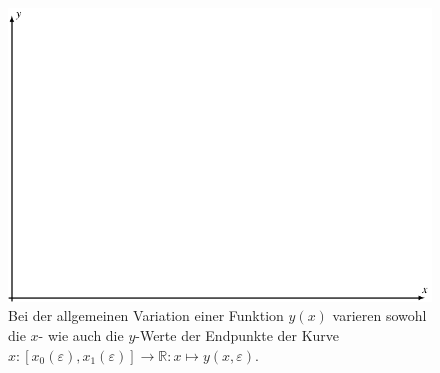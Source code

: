 %
%
%
\begin{figure}
\centering
\includegraphics{chapters/020-variation/images/variation.pdf}
\caption{Bei der allgemeinen Variation einer Funktion $y(x)$
varieren sowohl die $x$- wie auch die $y$-Werte der Endpunkte
der Kurve
$x\colon [x_0(\varepsilon),x_1(\varepsilon)]\to\mathbb{R}
:
x\mapsto y(x,\varepsilon)$.
\label{buch:variation:fig:variation}}
\end{figure}
